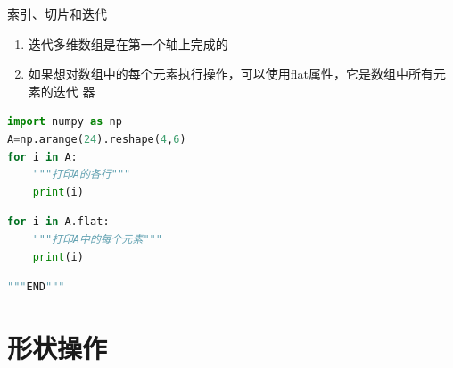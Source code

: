 \documentclass[ignorenonframetext,11pt,xcolor=dvipsnames,hyperref={colorlinks,allcolors=.,urlcolor=blue, citecolor=violet, bookmarksdepth=4},aspectratio=1610]{beamer}
\providecommand{\tightlist}{%
  \setlength{\itemsep}{0pt}\setlength{\parskip}{0pt}}
\begin{document}
\begin{frame}[fragile]{索引、切片和迭代}
\protect\hypertarget{section-14}{}

\begin{enumerate}
\tightlist
\item
  迭代多维数组是在第一个轴上完成的
\item
  如果想对数组中的每个元素执行操作，可以使用flat属性，它是数组中所有元素的迭代
  器
\end{enumerate}

\begin{lstlisting}[language=Python]
import numpy as np
A=np.arange(24).reshape(4,6)
for i in A:
    """打印A的各行"""
    print(i) 
\end{lstlisting}

\begin{lstlisting}[language=Python]
for i in A.flat:
    """打印A中的每个元素"""
    print(i)
\end{lstlisting}

\begin{lstlisting}[language=Python]
"""END"""
\end{lstlisting}

\end{frame}

\hypertarget{section-15}{%
\section{形状操作}\label{section-15}}
\end{document}
